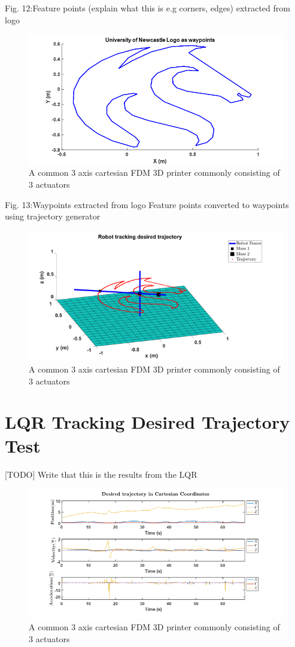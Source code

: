 \documentclass{UoNMCHA}
\numberwithin{equation}{section}
\begin{document}
Fig. 12:Feature points (explain what this is e.g corners, edges) extracted from logo

\begin{figure}[H]
	\begin{center}
		\includegraphics[width=.5\linewidth]{figs/Picture23}
		\caption{A  common 3 axis cartesian FDM 3D printer commonly consisting of 3 actuators}
		\label{figs/Picture23}
	\end{center}
\end{figure}

Fig. 13:Waypoints extracted from logo
Feature points converted to waypoints using trajectory generator

\begin{figure}[H]
	\begin{center}
		\includegraphics[width=.5\linewidth]{figs/Picture24}
		\caption{A  common 3 axis cartesian FDM 3D printer commonly consisting of 3 actuators}
		\label{figs/Picture24}
	\end{center}
\end{figure}

\section{LQR Tracking Desired Trajectory Test}

[TODO] Write that this is the results from the LQR

\begin{figure}[H]
	\begin{center}
		\includegraphics[width=.5\linewidth]{figs/Picture25}
		\caption{A  common 3 axis cartesian FDM 3D printer commonly consisting of 3 actuators}
		\label{figs/Picture25}
	\end{center}
\end{figure}
\end{document}
